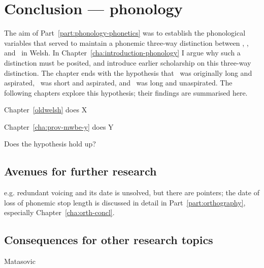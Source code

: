 \chapter{Conclusion --- phonology}
\label{cha:conclusion-phonology}

The aim of Part~\ref{part:phonology-phonetics} was to establish the phonological variables that served to maintain a phonemic three-way distinction between \xT, \lT, and \xD\ in Welsh. In Chapter~\ref{cha:introduction-phonology} I argue why such a distinction must be posited, and introduce earlier scholarship on this three-way distinction. The chapter ends with the hypothesis that \xT\ was originally long and aspirated, \lT\ was short and aspirated, and \xD\ was long and unaspirated. The following chapters explore this hypothesis; their findings are summarised here.

Chapter~\ref{oldwelsh} does X

Chapter~\ref{cha:prov-mwbe-y} does Y

Does the hypothesis hold up?


\section{Avenues for further research}
\label{sec:aven-furth-rese}

e.g. redundant voicing and its date is unsolved, but there are pointers; the date of loss of phonemic stop length is discussed in detail in Part~\ref{part:orthography}, especially Chapter~\ref{cha:orth-concl}.

\section{Consequences for other research topics}
\label{sec:cons-other-rese-1}

Matasovic

